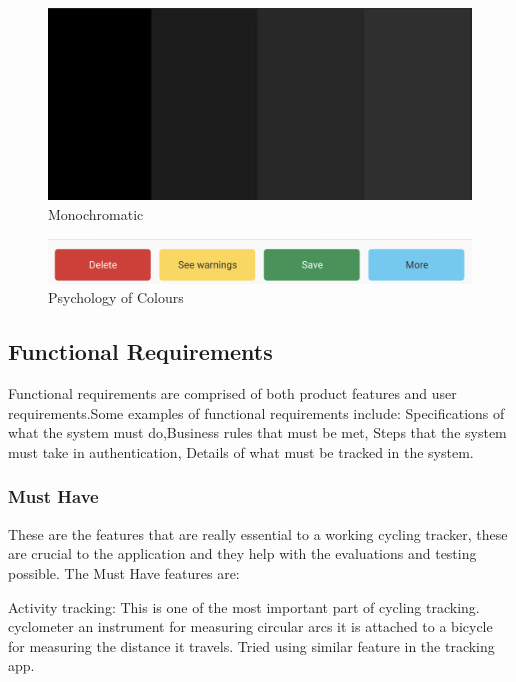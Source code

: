 \documentclass{l4proj}
\begin{document}
\begin{figure}
    \centering
     \includegraphics[width=1\textwidth]{images/mono.png}
     \caption{Monochromatic}
    \label{fig:Monochromatic}
\end{figure}

\begin{figure}
    \centering
     \includegraphics[width=1\textwidth]{images/090.png}
     \caption{Psychology of Colours}
    \label{fig:PsychologyofColours}
\end{figure}

\subsection{Functional Requirements} \label{functionalRequirements}

Functional requirements are comprised of both product features and user requirements.Some examples of functional requirements include: Specifications of what the system must do,Business rules that must be met, Steps that the system must take in authentication, Details of what must be tracked in the system. 
\subsubsection{Must Have}
These are the features that are really essential to a working cycling tracker, these are crucial to the application and they help with the evaluations and testing possible. The Must Have features are:  

Activity tracking: This is one of the most important part of cycling tracking. 
cyclometer an instrument for measuring circular arcs it is attached to a bicycle for measuring the distance it travels. Tried using similar feature in the tracking app.
\end{document}
